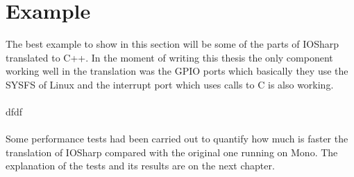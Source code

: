 \section{Example}\label{SS:AN-Process-Example}
The best example to show in this section will be some of the parts of IOSharp translated to C++. In the moment of writing this thesis the only component working well in the translation was the GPIO ports which basically they use the \gls{SYSFS} of Linux and the interrupt port which uses calls to C is also working.
\\
\\
dfdf
\\
\\
Some performance tests had been carried out to quantify how much is faster the translation of IOSharp compared with the original one running on Mono. The explanation of the tests and its results are on the next chapter.